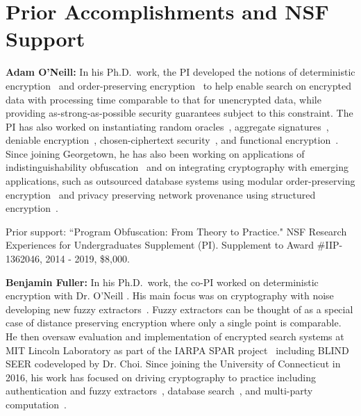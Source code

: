 \documentclass[11pt]{article}
\theoremstyle{remark}
\begin{document}
\section{Prior Accomplishments and NSF Support}

\textbf{Adam O'Neill:}
In his Ph.D.~work, the PI  developed the notions of deterministic encryption~\cite{C:BelBolOne07,ABO07,C:BolFehOne08,C:BFOR08,TCC:FulNeiRey12} and order-preserving encryption~\cite{EC:BCLO09,C:BolCheOne11} to help enable search on encrypted data with processing time comparable to that for unencrypted data, while providing as-strong-as-possible security guarantees subject to this constraint.
The PI has also worked on  instantiating random oracles~\cite{C:KilOneSmi10,TCC:GoyONeRao11,EC:LewONeSmi13},   aggregate signatures~\cite{CCS:BGOY07,AC:GLOW12}, deniable encryption~\cite{C:OnePeiWat11},  chosen-ciphertext security~\cite{EC:KilMohOne10,PKC:DFMO14}, and  functional encryption~\cite{EPRINT:ONeill10b,C:DIJOPP13, CANS:BelONe13}.   %
Since joining Georgetown, he has also been working on  applications of indistinguishability obfuscation~\cite{DGLOZ14} and on integrating cryptography with emerging applications, such as outsourced database systems using modular order-preserving encryption~\cite{SIGMOD:MCOKC15} and  privacy preserving network provenance using structured encryption~\cite{LOSZZ14}.

Prior support: ``Program Obfuscation: From Theory to Practice." NSF Research Experiences for Undergraduates Supplement (PI).
Supplement to Award \#IIP-1362046,   2014 - 2019, \$8,000.

\textbf{Benjamin Fuller:}
In his Ph.D.~work, the co-PI worked on deterministic encryption with Dr. O'Neill \cite{TCC:FulNeiRey12,JC:FulONeRey15}.  His main focus was on cryptography with noise developing new fuzzy extractors~\cite{AC:FulMenRey13,AC:FulReySmi16,EC:CFPRS16}.  Fuzzy extractors can be thought of as a special case of distance preserving encryption where only a single point is comparable.  He then oversaw evaluation and implementation of encrypted search systems at MIT Lincoln Laboratory as part of the IARPA SPAR project~\cite{spar_baa} including BLIND SEER codeveloped by Dr. Choi.  Since joining the University of Connecticut in 2016, his work has focused on driving cryptography to practice including authentication and fuzzy extractors~\cite{EPRINT:HFDD17,EPRINT:BKFY17,EPRINT:ABCFG16}, database search~\cite{SP:FVYSHG17}, and multi-party computation~\cite{EPRINT:CunFulYak16}.  
\end{document}
